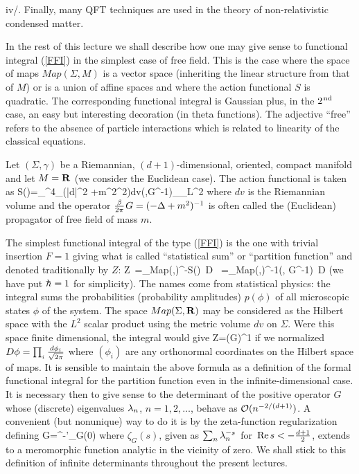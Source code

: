 iv/. Finally, many QFT techniques are used in the theory of
non-relativistic condensed matter.
\vskip 1cm

\vskip 0.4cm

\no In the rest of this lecture we shall describe how one may
give sense to functional integral (\ref{FFI}) in the simplest case of
free field. This is the case where the space of maps $Map(\Sigma,M)$
is a vector space (inheriting the linear structure from that of $M$)
or is a union of affine spaces and where the action functional
$S$ is quadratic. The corresponding functional integral
is Gaussian plus, in the $2^{\hspace{0.025cm} \rm nd}$ case, an easy but interesting
decoration (in theta functions). The adjective ``free'' refers to the
absence of particle interactions which is related to linearity
of the classical equations.
\vskip 0.3cm

Let $(\Sigma,\gamma)$ be a Riemannian, $(d+1)$-dimensional,
oriented, compact manifold and let $M={{\bf R}}$ (we consider
the Euclidean case). The action functional is taken as
\qq
S(\phi)={_\beta\over^{4\pi}}\int\limits_{\Sigma}(|d\phi|^2
+m^2\phi^2)\s dv\s\equiv{}\m(\phi,\m G^{-1}\phi)_{_{L^2}}
\label{Am}
\qqq
where $dv$ is the Riemannian volume and the operator ${\beta\over 2\pi}\hspace{0.025cm} G
=(-\Delta+m^2)^{-1}$ is often called the (Euclidean) propagator of
free field of mass $m$.
\vskip 0.3cm

The simplest functional integral of the type
(\ref{FFI}) is the one with trivial insertion $F=1$ giving what
is called ``statistical sum'' or ``partition function''
and denoted traditionally by $Z$:
\qq
Z\ =\s\int\limits_{Map(\Sigma,\NR)}\ee^{-S(\phi)}\ D\phi
\s\ =\s\s\int\limits_{Map(\Sigma,\NR)}\ee^{-{1}\m(\phi,
\m G^{-1}\phi)}\ D\phi
\non
\qqq
(we have put $\hh=1$ for simplicity). The names come from
statistical physics: the integral sums the probabilities
(probability amplitudes) $p(\phi)$ of all microscopic states
$\phi$ of the system. The space $Map(\Sigma,{{\bf R}})$ may be considered
as the Hilbert space with the $L^2$ scalar product using the metric
volume $dv$ on $\Sigma$. Were this space finite dimensional,
the integral would give
\qq
Z\s=\s (\det\s G)^{1}
\non
\qqq
if we normalized $D\phi=\prod_{_i}{d\phi_i\over\sqrt{2\pi}}$
where $(\phi_i)$ are any orthonormal coordinates on the Hilbert
space of maps. It is sensible to maintain the above
formula as a definition of the formal functional integral for
the partition function even in the infinite-dimensional case.
It is necessary then to give sense to the determinant
of the positive operator $G$ whose (discrete) eigenvalues
$\lambda_n$, $n=1,2,\dots$, behave as ${\cal O}(n^{-2/(d+1)})$. A convenient
(but nonunique) way to do it is by the zeta-function
regularization defining
\qq
\det\s G\s=\s\ee^{-\zeta'_G(0)}
\non
\qqq
where $\zeta_G(s)$, given as \s$\sum_n\lambda_n^{-s}\hspace{0.05cm}$ for
$\hspace{0.05cm}{\rm Re}\hspace{0.05cm} s<-{d+1\over2}$, extends to a meromorphic function analytic
in the vicinity of zero. We shall stick to this definition
of infinite determinants throughout the present lectures.
\vskip 0.3cm

